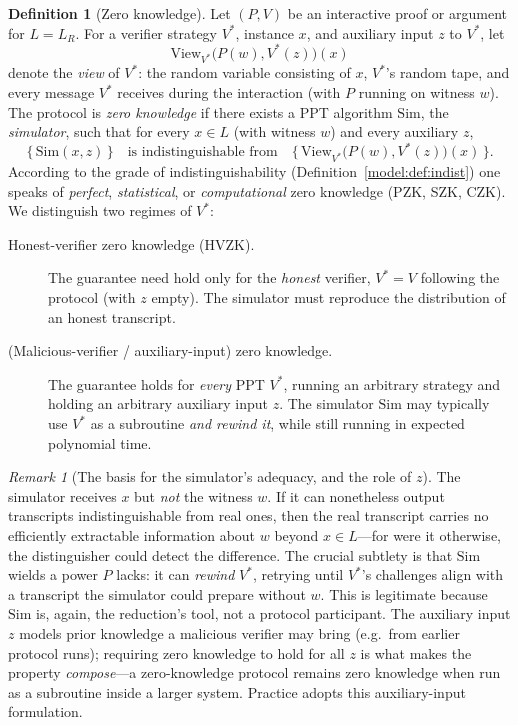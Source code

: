 \documentclass[11pt,a4paper]{article}
\theoremstyle{definition}
\newtheorem{definition}[theorem]{Definition}
\theoremstyle{remark}
\newtheorem{remark}[theorem]{Remark}
\begin{document}
\begin{definition}[Zero knowledge]\label{zk:def:zk}
Let \((P,V)\) be an interactive proof or argument for \(L = L_R\). For a verifier strategy \(V^*\), instance \(x\), and auxiliary input \(z\) to \(V^*\), let
\[
  \mathrm{View}_{V^*}\big(P(w), V^*(z)\big)(x)
\]
denote the \emph{view} of \(V^*\): the random variable consisting of \(x\), \(V^*\)'s random tape, and every message \(V^*\) receives during the interaction (with \(P\) running on witness \(w\)). The protocol is \emph{zero knowledge} if there exists a PPT algorithm \(\mathrm{Sim}\), the \emph{simulator}, such that for every \(x\in L\) (with witness \(w\)) and every auxiliary \(z\),
\[
  \big\{\, \mathrm{Sim}(x, z) \,\big\} \quad\text{is indistinguishable from}\quad \big\{\, \mathrm{View}_{V^*}\big(P(w), V^*(z)\big)(x) \,\big\}.
\]
According to the grade of indistinguishability (Definition~\ref{model:def:indist}) one speaks of \emph{perfect}, \emph{statistical}, or \emph{computational} zero knowledge (PZK, SZK, CZK). We distinguish two regimes of \(V^*\):
\begin{description}
  \item[Honest-verifier zero knowledge (HVZK).] The guarantee need hold only for the \emph{honest} verifier, \(V^* = V\) following the protocol (with \(z\) empty). The simulator must reproduce the distribution of an honest transcript.
  \item[(Malicious-verifier / auxiliary-input) zero knowledge.] The guarantee holds for \emph{every} PPT \(V^*\), running an arbitrary strategy and holding an arbitrary auxiliary input \(z\). The simulator \(\mathrm{Sim}\) may typically use \(V^*\) as a subroutine \emph{and rewind it}, while still running in expected polynomial time.
\end{description}
\end{definition}

\begin{remark}[The basis for the simulator's adequacy, and the role of \(z\)]\label{zk:rem:simandz}
The simulator receives \(x\) but \emph{not} the witness \(w\). If it can nonetheless output transcripts indistinguishable from real ones, then the real transcript carries no efficiently extractable information about \(w\) beyond \(x\in L\)---for were it otherwise, the distinguisher could detect the difference. The crucial subtlety is that \(\mathrm{Sim}\) wields a power \(P\) lacks: it can \emph{rewind} \(V^*\), retrying until \(V^*\)'s challenges align with a transcript the simulator could prepare without \(w\). This is legitimate because \(\mathrm{Sim}\) is, again, the reduction's tool, not a protocol participant. The auxiliary input \(z\) models prior knowledge a malicious verifier may bring (e.g.\ from earlier protocol runs); requiring zero knowledge to hold for all \(z\) is what makes the property \emph{compose}---a zero-knowledge protocol remains zero knowledge when run as a subroutine inside a larger system. Practice adopts this auxiliary-input formulation.
\end{remark}
\end{document}
